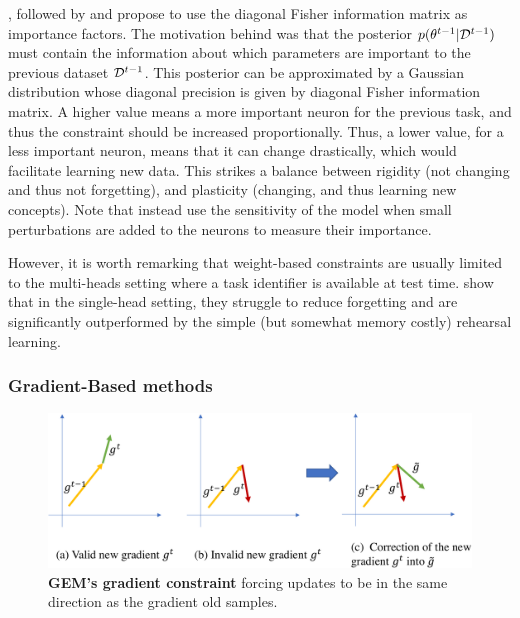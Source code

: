 \cite{kirkpatrick2017ewc}, followed by \cite{zenke2017synaptic_intelligence} and
\cite{chaudhry2018riemannien_walk} propose to use the diagonal Fisher information matrix as
importance factors. The motivation behind was that the posterior $p(\theta^{t-1} | \mathcal{D}^{t-1})$ must
contain the information about which parameters are important to the previous dataset $\mathcal{D}^{t-1}$.
This posterior can be approximated by a Gaussian distribution whose diagonal precision is given by
diagonal Fisher information matrix. A higher value means a more important neuron for the previous
task, and thus the constraint should be increased proportionally. Thus, a lower value, for a less
important neuron, means that it can change drastically, which would facilitate learning new data.
This strikes a balance between rigidity (not changing and thus not forgetting), and plasticity
(changing, and thus learning new concepts). Note that \cite{aljundi2018MemoryAwareSynapses} instead
use the sensitivity of the model when small perturbations are added to the neurons to measure their
importance.

However, it is worth remarking that weight-based constraints are usually limited to the multi-heads
setting where a task identifier is available at test time. \cite{lesort2019regulshortcomings} show
that in the single-head setting, they struggle to reduce forgetting and are significantly
outperformed by the simple (but somewhat memory costly) rehearsal learning.

\subsubsection{Gradient-Based methods}
\label{sec:related_regul_gradient}

\begin{figure}[tb]
      \begin{center}
            \includegraphics[width=1.0\linewidth]{images/related/gem.pdf}
      \end{center}
      \caption{\textbf{GEM's gradient constraint} forcing updates to be in the same direction as the
            gradient \wrt old samples.}
      \label{fig:related_gem}
\end{figure}

